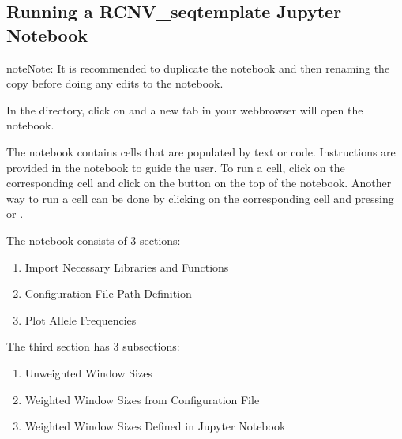 \documentclass[letterpaper,10pt,english]{sphinxhowto}
\begin{document}
\subsection{Running a RCNV\_seq\sphinxhyphen{}template Jupyter Notebook}
\label{\detokenize{index:running-a-rcnv-seq-template-jupyter-notebook}}
\begin{sphinxadmonition}{note}{Note:}
\sphinxAtStartPar
It is recommended to duplicate the  notebook and then renaming the copy before doing any edits to the notebook.
\end{sphinxadmonition}

\sphinxAtStartPar
In the  directory, click on  and a new tab in your web\sphinxhyphen{}browser will open the notebook.

\sphinxAtStartPar
The notebook contains cells that are populated by text or code. Instructions are provided in the notebook to guide the user. To run a cell, click on the corresponding cell and click on the  button on the top of the notebook. Another way to run a cell can be done by clicking on the corresponding cell and pressing  or .

\sphinxAtStartPar
The notebook consists of 3 sections:
\begin{enumerate}
%
\item {} 
\sphinxAtStartPar
Import Necessary Libraries and Functions

\item {} 
\sphinxAtStartPar
Configuration File Path Definition

\item {} 
\sphinxAtStartPar
Plot Allele Frequencies

\end{enumerate}

\sphinxAtStartPar
The third section  has 3 subsections:
\begin{enumerate}
%
\item {} 
\sphinxAtStartPar
Unweighted Window Sizes

\item {} 
\sphinxAtStartPar
Weighted Window Sizes from Configuration File

\item {} 
\sphinxAtStartPar
Weighted Window Sizes Defined in Jupyter Notebook

\end{enumerate}
\end{document}
